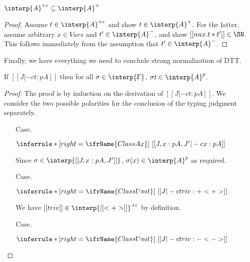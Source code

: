 \begin{lemma}
\label{lem:canonpos}
$\interp{A}^{+c}\subseteq\interp{A}^+$
\end{lemma}
\begin{proof}
Assume $t\in\interp{A}^{+c}$ and show $t\in\interp{A}^+$.
For the latter, assume arbitrary $x\in\textit{Vars}$ and $t'\in\interp{A}^-$,
and show $[[nu x . t * t']]\in\SN$.  This follows immediately
from the assumption that $t'\in\interp{A}^-$.
\end{proof}
Finally, we have everything we need to conclude strong normalization
of DTT.
\begin{thm}[Soundness]
\label{thm:sndinterp}
If $[[ J |-c t : p A]]$ then for all $\sigma\in\interp{\Gamma}$, $\sigma t\in\interp{A}^p$.
\end{thm}
\begin{proof}
The proof is by induction on the derivation of $[[ J |-c t : p A]]$.  We consider
the two possible polarities for the conclusion of the typing judgment separately.

\begin{itemize}
\item[Case.]\ 

\vspace{-.2cm}
\begin{center}
\begin{math}
\inferrule* [right=\ifrName{ClassAx}] {\ }{[[J , x : p A , J' |-c x : p A]]}
\end{math}
\end{center}

Since $\sigma\in\interp{[[J , x : p A, J']]}$, $\sigma(x)\in\interp{A}^p$ as required.

\item[Case.]\ 

\vspace{-.2cm}
\begin{center}
\begin{math}
\inferrule* [right=\ifrName{ClassUnit}] {\ }{[[J |-c triv : + < + >]]}
\end{math}
\end{center}

We have $[[triv]]\in\interp{[[<+>]]}^{+c}$ by definition.

\item[Case.]\ 

\vspace{-.2cm}
\begin{center}
\begin{math}
\inferrule* [right=\ifrName{ClassUnit}] {\ }{[[J |-c triv : - < - >]]}
\end{math}
\end{center}


\end{itemize}
\end{proof}
